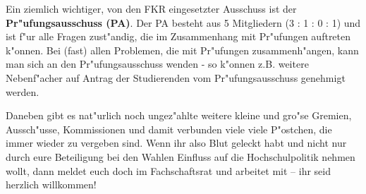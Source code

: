 \begin{multicols}{2}
		Ein ziemlich wichtiger, von den FKR eingesetzter Ausschuss ist der \textbf{Pr"ufungsausschuss (PA)}. Der PA besteht aus 5 Mitgliedern (3 : 1 : 0 : 1) und ist f"ur alle Fragen zust"andig, die im Zusammenhang mit Pr"ufungen auftreten k"onnen. Bei (fast) allen Problemen, die mit Pr"ufungen zusammenh"angen, kann man sich an den Pr"ufungsausschuss wenden - so k"onnen z.B. weitere Nebenf"acher auf Antrag der Studierenden vom Pr"ufungsausschuss genehmigt werden. 

		Daneben gibt es nat"urlich noch ungez"ahlte weitere kleine und gro"se Gremien, Aussch"usse, Kommissionen und damit verbunden viele viele P"ostchen, die immer wieder zu vergeben sind. Wenn ihr also Blut geleckt habt und nicht nur durch eure Beteiligung bei den Wahlen Einfluss auf die Hochschulpolitik nehmen wollt, dann meldet euch doch im Fachschaftsrat und arbeitet mit -- ihr seid herzlich willkommen!
\end{multicols}